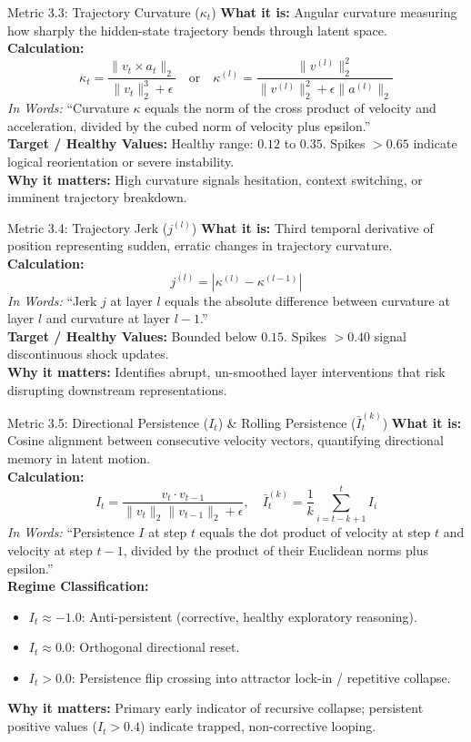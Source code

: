 \documentclass[11pt,a4paper]{article}
\begin{document}
\begin{metricbox}{Metric 3.3: Trajectory Curvature ($\kappa_t$)}
\textbf{What it is:} Angular curvature measuring how sharply the hidden-state trajectory bends through latent space.\\
\textbf{Calculation:}
 $$\kappa_t = \frac{\|v_t \times a_t\|_2}{\|v_t\|_2^3 + \epsilon} \quad \text{or} \quad \kappa^{(l)} = \frac{\|v^{(l)}\|_2^2}{\|v^{(l)}\|_2^2 + \epsilon \|a^{(l)}\|_2}$$ \emph{In Words:} ``Curvature $\kappa$ equals the norm of the cross product of velocity and acceleration, divided by the cubed norm of velocity plus epsilon.''\\
\textbf{Target / Healthy Values:} Healthy range: $0.12$ to $0.35$. Spikes $> 0.65$ indicate logical reorientation or severe instability.\\
\textbf{Why it matters:} High curvature signals hesitation, context switching, or imminent trajectory breakdown.
\end{metricbox}

\begin{metricbox}{Metric 3.4: Trajectory Jerk ($j^{(l)}$)}
\textbf{What it is:} Third temporal derivative of position representing sudden, erratic changes in trajectory curvature.\\
\textbf{Calculation:}
 $$j^{(l)} = \left|\kappa^{(l)} - \kappa^{(l-1)}\right|$$ \emph{In Words:} ``Jerk $j$ at layer $l$ equals the absolute difference between curvature at layer $l$ and curvature at layer $l-1$.''\\
\textbf{Target / Healthy Values:} Bounded below $0.15$. Spikes $> 0.40$ signal discontinuous shock updates.\\
\textbf{Why it matters:} Identifies abrupt, un-smoothed layer interventions that risk disrupting downstream representations.
\end{metricbox}

\begin{metricbox}{Metric 3.5: Directional Persistence ($I_t$) \& Rolling Persistence ($\bar{I}_t^{(k)}$)}
\textbf{What it is:} Cosine alignment between consecutive velocity vectors, quantifying directional memory in latent motion.\\
\textbf{Calculation:}
 $$I_t = \frac{v_t \cdot v_{t-1}}{\|v_t\|_2 \|v_{t-1}\|_2 + \epsilon}, \quad \bar{I}_t^{(k)} = \frac{1}{k} \sum_{i=t-k+1}^t I_i$$ \emph{In Words:} ``Persistence $I$ at step $t$ equals the dot product of velocity at step $t$ and velocity at step $t-1$, divided by the product of their Euclidean norms plus epsilon.''\\
\textbf{Regime Classification:}
\begin{itemize}
    \item $I_t \approx -1.0$: Anti-persistent (corrective, healthy exploratory reasoning).
    \item $I_t \approx 0.0$: Orthogonal directional reset.
    \item $I_t > 0.0$: Persistence flip crossing into attractor lock-in / repetitive collapse.
\end{itemize}
\textbf{Why it matters:} Primary early indicator of recursive collapse; persistent positive values ($I_t > 0.4$) indicate trapped, non-corrective looping.
\end{metricbox}
\end{document}
